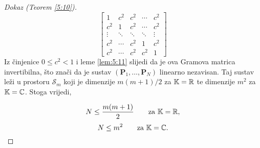 \documentclass[a4paper,twoside,12pt]{memoir} %
\newcommand{\vect}[1]{\mathbf{#1}}
\renewcommand{\vec}{\vect}
\begin{document}
\begin{proof}[Dokaz (Teorem \ref{5:10})]
    \begin{equation*}
        \begin{bmatrix*}
            1 & c^2 & c^2 & \cdots & c^2 \\
            c^2 & 1 & c^2 & \cdots & c^2 \\
            \vdots & \ddots & \ddots & \ddots & \vdots \\ 
            c^2 & \cdots & c^2 & 1 & c^2 \\
            c^2 & \cdots & c^2 & c^2 & 1 
        \end{bmatrix*}
    \end{equation*}
    Iz \v{c}injenice $0 \leq c^2 < 1$ i leme \ref{lem:5:11} slijedi da je ova Gramova matrica invertibilna, \v{s}to zna\v{c}i da je sustav $(\vec P_1, \dots, \vec P_N)$ linearno nezavisan. Taj sustav le\v{z}i u prostoru $\mathcal{S}_m$ koji je dimenzije $m(m+1)/2$ za $\mathbb{K} = \mathbb{R}$ te dimenzije $m^2$ za $\mathbb{K} = \mathbb{C}$. Stoga vrijedi,

    \begin{equation*}
        N \leq \frac{m(m+1)}{2} \quad \quad \text{za } \mathbb{K} = \mathbb{R}, 
    \end{equation*}
    \begin{equation*}
        N \leq m^2 \quad \quad \text{za } \mathbb{K} = \mathbb{C}.
    \end{equation*}
    
\end{proof}





\pagestyle{empty} %


\begin{sazetak}
\end{sazetak}

\begin{summary}
\end{summary}


\begin{cv}
\end{cv}
\end{document}
